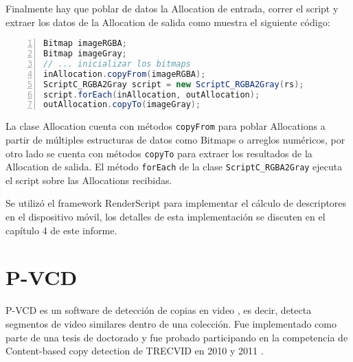 Finalmente hay que poblar de datos la Allocation de entrada, correr el script y extraer los datos de la Allocation de salida como muestra el siguiente código:

\begin{lstlisting}[language=Java, frame=bt, numbers=left]
Bitmap imageRGBA;
Bitmap imageGray;
// ... inicializar los bitmaps
inAllocation.copyFrom(imageRGBA);
ScriptC_RGBA2Gray script = new ScriptC_RGBA2Gray(rs);
script.forEach(inAllocation, outAllocation);
outAllocation.copyTo(imageGray);
\end{lstlisting}

La clase Allocation cuenta con métodos \texttt{copyFrom} para poblar Allocations a partir de múltiples estructuras de datos como Bitmaps o arreglos numéricos, por otro lado se cuenta con métodos \texttt{copyTo} para extraer los resultados de la Allocation de salida. El método \texttt{forEach} de la clase \texttt{ScriptC\_RGBA2Gray} ejecuta el script sobre las Allocations recibidas.

Se utilizó el framework RenderScript para implementar el cálculo de descriptores en el dispositivo móvil, los detalles de esta implementación se discuten en el capítulo 4 de este informe.

\section{P-VCD}
P-VCD es un software de detección de copias en video \cite{p-vcd1}, es decir, detecta segmentos de video similares dentro de una colección. Fue implementado como parte de una tesis de doctorado y fue probado participando en la competencia de Content-based copy detection de TRECVID en 2010 y 2011 \cite{p-vcd2}.

